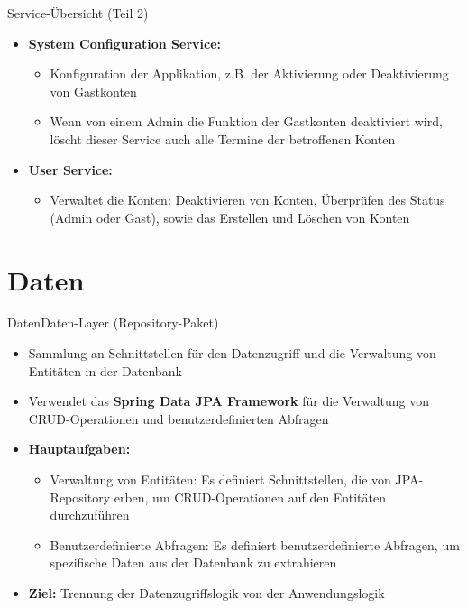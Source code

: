 \documentclass{sdqbeamer}
\begin{document}
\begin{frame}{Service-Übersicht (Teil 2)}
    \begin{itemize}
        \item \textbf{System Configuration Service:}
        \begin{itemize}
            \item Konfiguration der Applikation, z.B. der Aktivierung oder Deaktivierung von Gastkonten
            \item Wenn von einem Admin die Funktion der Gastkonten deaktiviert wird, löscht dieser Service auch alle Termine der betroffenen Konten
        \end{itemize}
        \item \textbf{User Service:}
        \begin{itemize}
            \item Verwaltet die Konten: Deaktivieren von Konten, Überprüfen des Status (Admin oder Gast), sowie das Erstellen und Löschen von Konten
        \end{itemize}
    \end{itemize}
\end{frame}

\section{Daten}

\begin{frame}{Daten}{Daten-Layer (Repository-Paket)}
    \begin{itemize}
        \item Sammlung an Schnittstellen für den Datenzugriff und die Verwaltung von Entitäten in der Datenbank
        \item Verwendet das \textbf{Spring Data JPA Framework} für die Verwaltung von CRUD-Operationen und benutzerdefinierten Abfragen
        \item \textbf{Hauptaufgaben:}
        \begin{itemize}
            \item Verwaltung von Entitäten: Es definiert Schnittstellen, die von JPA-Repository erben, um CRUD-Operationen auf den Entitäten durchzuführen
            \item Benutzerdefinierte Abfragen: Es definiert benutzerdefinierte Abfragen, um spezifische Daten aus der Datenbank zu extrahieren
        \end{itemize}
        \item \textbf{Ziel:} Trennung der Datenzugriffslogik von der Anwendungslogik
    \end{itemize}
\end{frame}
\end{document}
